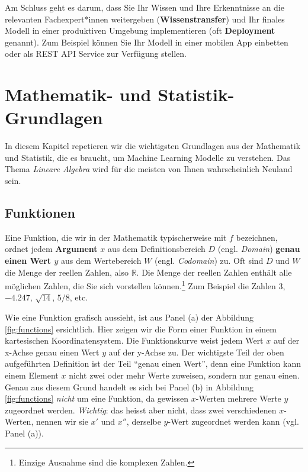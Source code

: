 \documentclass[
]{book}
\begin{document}
Am Schluss geht es darum, dass Sie Ihr Wissen und Ihre Erkenntnisse an die relevanten Fachexpert*innen weitergeben (\textbf{Wissenstransfer}) und Ihr finales Modell in einer produktiven Umgebung implementieren (oft \textbf{Deployment} genannt). Zum Beispiel können Sie Ihr Modell in einer mobilen App einbetten oder als REST API Service zur Verfügung stellen.

\hypertarget{basics}{%
\chapter{Mathematik- und Statistik-Grundlagen}\label{basics}}

In diesem Kapitel repetieren wir die wichtigsten Grundlagen aus der Mathematik und Statistik, die es braucht, um Machine Learning Modelle zu verstehen. Das Thema \emph{Lineare Algebra} wird für die meisten von Ihnen wahrscheinlich Neuland sein.

\hypertarget{funktionen}{%
\section{Funktionen}\label{funktionen}}

Eine Funktion, die wir in der Mathematik typischerweise mit \(f\) bezeichnen, ordnet jedem \textbf{Argument} \(x\) aus dem Definitionsbereich \(D\) (engl. \emph{Domain}) \textbf{genau einen Wert \(y\)} aus dem Wertebereich \(W\) (engl. \emph{Codomain}) zu. Oft sind \(D\) und \(W\) die Menge der reellen Zahlen, also \(\mathbb{R}\). Die Menge der reellen Zahlen enthält alle möglichen Zahlen, die Sie sich vorstellen können.\footnote{Einzige Ausnahme sind die komplexen Zahlen.} Zum Beispiel die Zahlen \(3\), \(-4.247\), \(\sqrt{14}\), \(5/8\), etc.

Wie eine Funktion grafisch aussieht, ist aus Panel (a) der Abbildung \ref{fig:functions} ersichtlich. Hier zeigen wir die Form einer Funktion in einem kartesischen Koordinatensystem. Die Funktionskurve weist jedem Wert \(x\) auf der x-Achse genau einen Wert \(y\) auf der y-Achse zu. Der wichtigste Teil der oben aufgeführten Definition ist der Teil ``genau einen Wert'', denn eine Funktion kann einem Element \(x\) nicht zwei oder mehr Werte zuweisen, sondern nur genau einen. Genau aus diesem Grund handelt es sich bei Panel (b) in Abbildung \ref{fig:functions} \emph{nicht} um eine Funktion, da gewissen \(x\)-Werten mehrere Werte \(y\) zugeordnet werden. \emph{Wichtig}: das heisst aber nicht, dass zwei verschiedenen \(x\)-Werten, nennen wir sie \(x'\) und \(x''\), derselbe \(y\)-Wert zugeordnet werden kann (vgl. Panel (a)).
\end{document}

